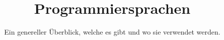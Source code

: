 

\title{Programmiersprachen}
\subtitle{Ein genereller Überblick, welche es gibt und wo sie verwendet werden.}




\backgroundTitle
\begin{frame}
    \thispagestyle{empty}
    \begin{columns}
        \column{0.6\paperwidth}
        \color{hhuBlau}
        \LARGE \inserttitle\\[\baselineskip]
        \large \insertauthor
    \end{columns}
\end{frame}
\backgroundNormal















